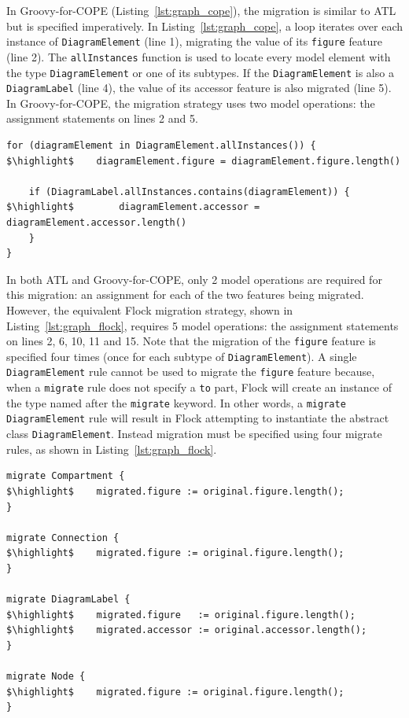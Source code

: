 In Groovy-for-COPE (Listing~\ref{lst:graph_cope}), the migration is similar to ATL but is specified imperatively. In Listing~\ref{lst:graph_cope}, a loop iterates over each instance of \texttt{DiagramElement} (line 1), migrating the value of its \texttt{figure} feature (line 2). The \texttt{allInstances} function is used to locate every model element with the type \texttt{DiagramElement} or one of its subtypes. If the \texttt{DiagramElement} is also a \texttt{DiagramLabel} (line 4), the value of its accessor feature is also migrated (line 5). In Groovy-for-COPE, the migration strategy uses two model operations: the assignment statements on lines 2 and 5. 

\begin{lstlisting}[float=tbp, caption=Simplified GMF Graph model migration in COPE, label=lst:graph_cope, language=COPE, tabsize=2]
for (diagramElement in DiagramElement.allInstances()) {
$\highlight$	diagramElement.figure = diagramElement.figure.length()
	
	if (DiagramLabel.allInstances.contains(diagramElement)) {
$\highlight$		diagramElement.accessor = diagramElement.accessor.length()
	}
}
\end{lstlisting}

In both ATL and Groovy-for-COPE, only 2 model operations are required for this migration: an assignment for each of the two features being migrated. However, the equivalent Flock migration strategy, shown in Listing~\ref{lst:graph_flock}, requires 5 model operations: the assignment statements on lines 2, 6, 10, 11 and 15. Note that the migration of the \texttt{figure} feature is specified four times (once for each subtype of \texttt{DiagramElement}). A single \texttt{DiagramElement} rule cannot be used to migrate the \texttt{figure} feature because, when a \texttt{migrate} rule does not specify a \texttt{to} part, Flock will create an instance of the type named after the \texttt{migrate} keyword. In other words, a \texttt{migrate DiagramElement} rule will result in Flock attempting to instantiate the abstract class \texttt{DiagramElement}. Instead migration must be specified using four migrate rules, as shown in Listing~\ref{lst:graph_flock}.

\begin{lstlisting}[float=tbp, caption=Simplified GMF Graph model migration in Flock, label=lst:graph_flock, language=Flock, tabsize=2]
migrate Compartment {
$\highlight$	migrated.figure := original.figure.length();
}

migrate Connection {
$\highlight$	migrated.figure := original.figure.length();
}

migrate DiagramLabel {
$\highlight$	migrated.figure   := original.figure.length();
$\highlight$	migrated.accessor := original.accessor.length();
}

migrate Node {
$\highlight$	migrated.figure := original.figure.length();
}
\end{lstlisting}

